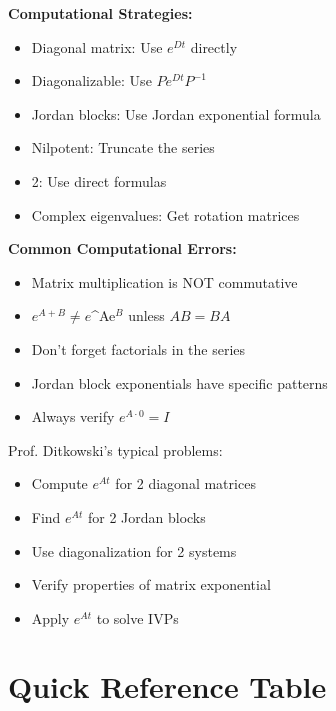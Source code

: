 \documentclass[12pt]{article}
\begin{document}
\begin{insight}
\textbf{Computational Strategies:}
\begin{itemize}
\item Diagonal matrix: Use $e^{Dt}$ directly
\item Diagonalizable: Use $Pe^{Dt}P^{-1}$
\item Jordan blocks: Use Jordan exponential formula
\item Nilpotent: Truncate the series
\item 2: Use direct formulas
\item Complex eigenvalues: Get rotation matrices
\end{itemize}
\end{insight}

\begin{warning}
\textbf{Common Computational Errors:}
\begin{itemize}
\item Matrix multiplication is NOT commutative
\item $e^{A+B} \neq e$^{Ae}$^B$ unless $AB = BA$
\item Don't forget factorials in the series
\item Jordan block exponentials have specific patterns
\item Always verify $e^{A \cdot 0} = I$
\end{itemize}
\end{warning}

\begin{examtip}
Prof. Ditkowski's typical problems:
\begin{itemize}
\item Compute $e^{At}$ for 2 diagonal matrices
\item Find $e^{At}$ for 2 Jordan blocks
\item Use diagonalization for 2 systems
\item Verify properties of matrix exponential
\item Apply $e^{At}$ to solve IVPs
\end{itemize}
\end{examtip}

\section{Quick Reference Table}
\end{document}
